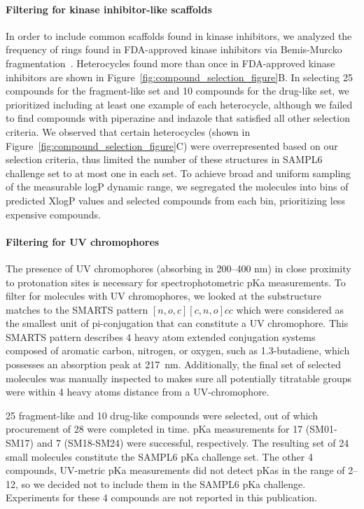 \documentclass[9pt,lineno]{elife}
\begin{document}
\paragraph{Filtering for kinase inhibitor-like scaffolds}

In order to include common scaffolds found in kinase inhibitors, we analyzed the frequency of rings found in FDA-approved kinase inhibitors via Bemis-Murcko fragmentation~\citep{bemis_properties_1996, oemedchemtk_openeye_2017}. 
Heterocycles found more than once in FDA-approved kinase inhibitors are shown in Figure~\ref{fig:compound_selection_figure}B. 
In selecting 25 compounds for the fragment-like set and 10 compounds for the drug-like set, we prioritized including at least one example of each heterocycle, although we failed to find compounds with piperazine and indazole that satisfied all other selection criteria. 
We observed that certain heterocycles (shown in Figure~\ref{fig:compound_selection_figure}C) were overrepresented based on our selection criteria, thus limited the number of these structures in SAMPL6 challenge set to at most one in each set.
To achieve broad and uniform sampling of the measurable logP dynamic range, we segregated the molecules into bins of predicted XlogP values and selected compounds from each bin, prioritizing less expensive compounds. 

\paragraph{Filtering for UV chromophores}

The presence of UV chromophores (absorbing in 200--400 nm) in close proximity to protonation sites is necessary for spectrophotometric pKa measurements. 
To filter for molecules with UV chromophores, we looked at the substructure matches to the SMARTS pattern $[n,o,c][c,n,o]cc$ which were considered as the smallest unit of pi-conjugation that can constitute a UV chromophore. 
This SMARTS pattern describes 4 heavy atom extended conjugation systems composed of aromatic carbon, nitrogen, or oxygen, such as 1.3-butadiene, which possesses an absorption peak at 217~nm. 
Additionally, the final set of selected molecules was manually inspected to makes sure all potentially titratable groups were within 4 heavy atoms distance from a UV-chromophore.

25 fragment-like and 10 drug-like compounds were selected, out of which procurement of 28 were completed in time. pKa measurements for 17 (SM01-SM17) and 7 (SM18-SM24) were successful, respectively. The resulting set of 24 small molecules constitute the SAMPL6 pKa challenge set.
The other 4 compounds, UV-metric pKa measurements did not detect pKas in the range of 2--12, so we decided not to include them in the SAMPL6 pKa challenge. Experiments for these 4 compounds are not reported in this publication. 
\end{document}
